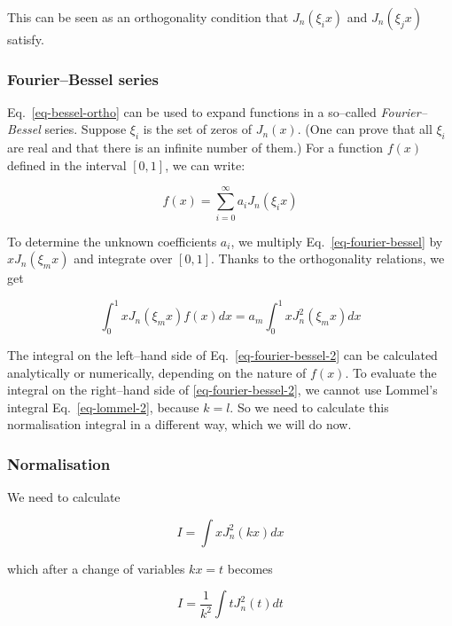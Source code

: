 This can be seen as an orthogonality condition that $J_n(\xi_i x)$ and $J_n(\xi_j x)$ satisfy.

\subsubsection{Fourier--Bessel series}

Eq.~\ref{eq-bessel-ortho} can be used to expand functions in a so--called \emph{Fourier--Bessel} series. Suppose $\xi_i$ is the set of zeros of $J_n(x)$. (One can prove that all $\xi_i$ are real and that there is an infinite number of them.) For a function $f(x)$ defined in the interval $[0,1]$, we can write:

\begin{equation}
f(x) = \sum_{i=0}^{\infty} a_i J_n(\xi_i x) \label{eq-fourier-bessel}
\end{equation} 

To determine the unknown coefficients $a_i$, we multiply Eq.~\ref{eq-fourier-bessel} by $x J_n(\xi_m x)$ and integrate over $[0,1]$. Thanks to the orthogonality relations, we get

\begin{equation}
\int_0^1 x J_n(\xi_m x) f(x) dx = a_m \int_0^1 x J_n^2(\xi_m x) dx \label{eq-fourier-bessel-2}
\end{equation} 

The integral on the left--hand side of Eq.~\ref{eq-fourier-bessel-2} can be calculated analytically or numerically, depending on the nature of $f(x)$. To evaluate the integral on the right--hand side of \ref{eq-fourier-bessel-2}, we cannot use Lommel's integral Eq.~\ref{eq-lommel-2}, because $k=l$. So we need to calculate this normalisation integral in a different way, which we will do now.

\subsubsection{Normalisation}

We need to calculate

\begin{equation}
I = \int x J_n^2(k x) dx
\end{equation}

which after a change of variables $kx = t$ becomes

\begin{equation}
I = \frac{1}{k^2} \int t J_n^2(t) dt
\end{equation}

